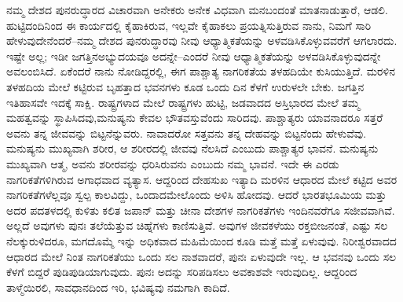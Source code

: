 ನಮ್ಮ ದೇಶದ ಪುನರುದ್ಧಾರದ ವಿಚಾರವಾಗಿ ಅನೇಕರು ಅನೇಕ ವಿಧವಾಗಿ ಮನಬಂದಂತೆ ಮಾತನಾಡುತ್ತಾರೆ, ಆಡಲಿ. ಹುಟ್ಟಿದಂದಿನಿಂದ ಈ ಕಾರ್ಯದಲ್ಲಿ ಕೈಹಾಕಿರುವ, ಇಲ್ಲವೇ ಕೈಹಾಕಲು ಪ್ರಯತ್ನಿಸುತ್ತಿರುವ ನಾನು, ನಿಮಗೆ ಸಾರಿ ಹೇಳುವುದೇನೆಂದರೆ–ನಮ್ಮ ದೇಶದ ಪುನರುದ್ಧಾರವು ನೀವು ಆಧ್ಯಾತ್ಮಿಕತೆಯನ್ನು ಅಳವಡಿಸಿಕೊಳ್ಳುವವರೆಗೆ ಆಗಲಾರದು. ಇಷ್ಟೇ ಅಲ್ಲ; ಇಡೀ ಜಗತ್ತಿನ\break ಅಭ್ಯುದಯವೂ ಅದನ್ನೇ–ಎಂದರೆ ನೀವು ಆಧ್ಯಾತ್ಮಿಕತೆಯನ್ನು ಅಳವಡಿಸಿ\break ಕೊಳ್ಳುವುದನ್ನೇ ಅವಲಂಬಿಸಿದೆ. ಏಕೆಂದರೆ ನಾನು ನೋಡಿದ್ದರಲ್ಲಿ, ಈಗ ಪಾಶ್ಚಾತ್ಯ ನಾಗರಿಕತೆಯ ತಳಹದಿಯೇ ಕುಸಿಯುತ್ತಿದೆ. ಮರಳಿನ ತಳಹದಿಯ ಮೇಲೆ ಕಟ್ಟಿರುವ ಬೃಹತ್ತಾದ ಭವನಗಳು ಕೂಡ ಒಂದು ದಿನ ಕೆಳಗೆ ಉರುಳಲೇ ಬೇಕು. ಜಗತ್ತಿನ ಇತಿಹಾಸವೇ ಇದಕ್ಕೆ ಸಾಕ್ಷಿ. ರಾಷ್ಟ್ರಗಳಾದ ಮೇಲೆ ರಾಷ್ಟ್ರಗಳು ಹುಟ್ಟಿ, ಜಡವಾದದ ಅಸ್ತಿಭಾರದ ಮೇಲೆ ತಮ್ಮ ಮಹತ್ವವನ್ನು ಸ್ಥಾಪಿಸಿದವು,\break ಮನುಷ್ಯನು ಕೇವಲ ಭೌತವಸ್ತುವೆಂದು ಸಾರಿದವು. ಪಾಶ್ಚಾತ್ಯರು ಯಾವ\-ನಾದರೂ ಸತ್ತರೆ ಅವನು ತನ್ನ ಜೀವವನ್ನು ಬಿಟ್ಟನೆನ್ನುವರು. ನಾವಾದರೋ ಸತ್ತವನು ತನ್ನ ದೇಹವನ್ನು ಬಿಟ್ಟನೆಂದು ಹೇಳುವೆವು. ಮನುಷ್ಯನು ಮುಖ್ಯವಾಗಿ ಶರೀರ, ಆ ಶರೀರದಲ್ಲಿ ಜೀವವು ನೆಲಸಿದೆ ಎಂಬುದು ಪಾಶ್ಚಾತ್ಯರ ಭಾವನೆ. ಮನುಷ್ಯನು ಮುಖ್ಯವಾಗಿ ಆತ್ಮ, ಅವನು ಶರೀರವನ್ನು ಧರಿಸಿರುವನು ಎಂಬುದು ನಮ್ಮ ಭಾವನೆ. ಇದೇ ಈ ಎರಡು ನಾಗರಿಕತೆಗಳಿಗಿರುವ ಅಗಾಧವಾದ ವ್ಯತ್ಯಾಸ. ಆದ್ದರಿಂದ ದೇಹಸುಖ ಇತ್ಯಾದಿ ಮರಳಿನ ಆಧಾರದ ಮೇಲೆ ಕಟ್ಟಿದ ಅವರ ನಾಗರಿಕತೆಗಳೆಲ್ಲವೂ ಸ್ವಲ್ಪ ಕಾಲವಿದ್ದು, ಒಂದಾದಮೇಲೊಂದು ಅಳಿಸಿ ಹೋದವು. ಆದರೆ ಭಾರತಭೂಮಿಯ ಮತ್ತು ಅದರ ಪದತಳದಲ್ಲಿ ಕುಳಿತು ಕಲಿತ ಜಪಾನ್​ ಮತ್ತು ಚೀನಾ ದೇಶಗಳ ನಾಗರಿಕತೆಗಳು ಇಂದಿನವರೆಗೂ ಸಜೀವವಾಗಿವೆ. ಅಲ್ಲದೆ ಅವುಗಳು ಪುನಃ ತಲೆಯೆತ್ತುವ ಚಿಹ್ನೆಗಳು ಕಾಣಿಸುತ್ತಿವೆ. ಅವುಗಳ ಜೀವಕಳೆಯು ರಕ್ತಬೀಜನಂತೆ, ಎಷ್ಟು ಸಲ ನೆಲಕ್ಕುರುಳಿದರೂ, ಮಗದೊಮ್ಮೆ ಇನ್ನು ಅಧಿಕವಾದ ಮಹಿಮೆಯಿಂದ ಕೂಡಿ ಮತ್ತೆ ಮತ್ತೆ ಏಳುವುವು. ನಿರೀಶ್ವರವಾದದ ಆಧಾರದ ಮೇಲೆ ನಿಂತ ನಾಗರಿಕತೆಯು ಒಂದು ಸಲ ನಾಶವಾದರೆ, ಪುನಃ ಏಳುವುದೇ ಇಲ್ಲ. ಆ ಭವನವು ಒಂದು ಸಲ ಕೆಳಗೆ ಬಿದ್ದರೆ ಪುಡಿಪುಡಿಯಾಗುವುದು. ಪುನಃ ಅದನ್ನು ಸರಿಪಡಿಸಲು ಅವಕಾಶವೇ ಇರುವು\-ದಿಲ್ಲ. ಆದ್ದರಿಂದ ತಾಳ್ಮೆಯಿರಲಿ, ಸಾವಧಾನದಿಂದ ಇರಿ, ಭವಿಷ್ಯವು ನಮಗಾಗಿ ಕಾದಿದೆ.

